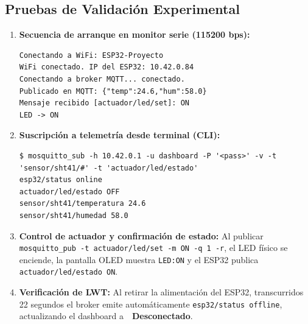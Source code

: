 \subsection{Pruebas de Validación Experimental}
\begin{enumerate}
    \item \textbf{Secuencia de arranque en monitor serie (115200 bps):}
\begin{lstlisting}[style=custombash]
Conectando a WiFi: ESP32-Proyecto
WiFi conectado. IP del ESP32: 10.42.0.84
Conectando a broker MQTT... conectado.
Publicado en MQTT: {"temp":24.6,"hum":58.0}
Mensaje recibido [actuador/led/set]: ON
LED -> ON
\end{lstlisting}
    \item \textbf{Suscripción a telemetría desde terminal (CLI):}
\begin{lstlisting}[style=custombash]
$ mosquitto_sub -h 10.42.0.1 -u dashboard -P '<pass>' -v -t 'sensor/sht41/#' -t 'actuador/led/estado'
esp32/status online
actuador/led/estado OFF
sensor/sht41/temperatura 24.6
sensor/sht41/humedad 58.0
\end{lstlisting}
    \item \textbf{Control de actuador y confirmación de estado:} Al publicar \texttt{mosquitto\_pub -t actuador/led/set -m ON -q 1 -r}, el LED físico se enciende, la pantalla OLED muestra \texttt{LED:ON} y el ESP32 publica \texttt{actuador/led/estado ON}.
    \item \textbf{Verificación de LWT:} Al retirar la alimentación del ESP32, transcurridos 22 segundos el broker emite automáticamente \texttt{esp32/status offline}, actualizando el dashboard a \textbf{🔴 Desconectado}.
\end{enumerate}
